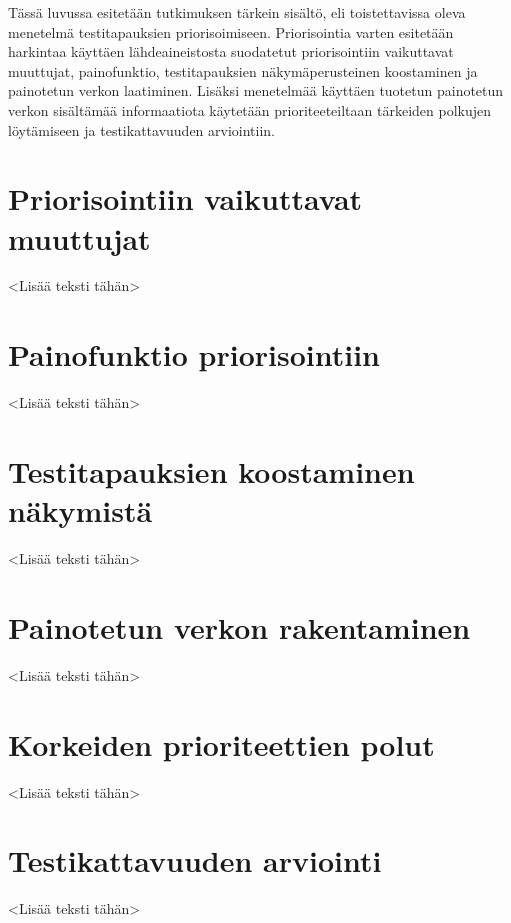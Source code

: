 Tässä luvussa esitetään tutkimuksen tärkein sisältö, eli toistettavissa oleva menetelmä testitapauksien priorisoimiseen.
Priorisointia varten esitetään harkintaa käyttäen lähdeaineistosta suodatetut priorisointiin vaikuttavat muuttujat, painofunktio, testitapauksien näkymäperusteinen koostaminen ja painotetun verkon laatiminen.
Lisäksi menetelmää käyttäen tuotetun painotetun verkon sisältämää informaatiota käytetään prioriteeteiltaan tärkeiden polkujen löytämiseen ja testikattavuuden arviointiin.

\section{Priorisointiin vaikuttavat muuttujat}

<Lisää teksti tähän>

\section{Painofunktio priorisointiin}

<Lisää teksti tähän>

\section{Testitapauksien koostaminen näkymistä}

<Lisää teksti tähän>

\section{Painotetun verkon rakentaminen}

<Lisää teksti tähän>

\section{Korkeiden prioriteettien polut}

<Lisää teksti tähän>

\section{Testikattavuuden arviointi}

<Lisää teksti tähän>
